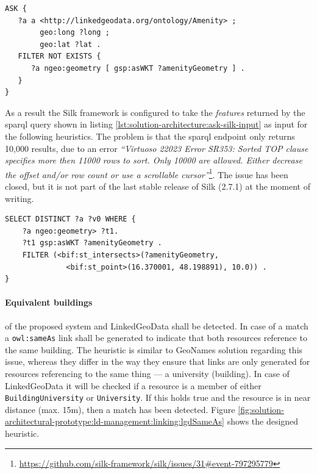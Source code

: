 \documentclass[draft,final]{vutinfth} %
\begin{document}
\begin{lstlisting}[language=sparql, frame=single, basicstyle=\footnotesize, caption=Ask if there is a feature with a location point that has no geometry instance., label={lst:solution-architecture:ask-location-point-geometry}]
ASK {
   ?a a <http://linkedgeodata.org/ontology/Amenity> ;
        geo:long ?long ;
        geo:lat ?lat .
   FILTER NOT EXISTS {
      ?a ngeo:geometry [ gsp:asWKT ?amenityGeometry ] .
   }
}
\end{lstlisting}

As a result the Silk framework is configured to take the \textit{features} returned by the \gls{sparql} query shown in listing \ref{lst:solution-architecture:ask-silk-input} as input for the following heuristics. The problem is that the \gls{sparql} endpoint only returns 10,000 results, due to an error \textit{``Virtuoso 22023 Error SR353: Sorted TOP clause specifies more then 11000 rows to sort. Only 10000 are allowed. Either decrease the offset and/or row count or use a scrollable cursor''}\footnote{\url{https://github.com/silk-framework/silk/issues/31\#event-797295779}}. The issue has been closed, but it is not part of the last stable release of Silk (2.7.1) at the moment of writing.

\begin{lstlisting}[language=sparql, frame=single, basicstyle=\footnotesize, caption=Query for preparing the input for linking., label={lst:solution-architecture:ask-silk-input}]
SELECT DISTINCT ?a ?v0 WHERE {
	?a ngeo:geometry> ?t1. 
	?t1 gsp:asWKT ?amenityGeometry .
	FILTER (<bif:st_intersects>(?amenityGeometry,
			  <bif:st_point>(16.370001, 48.198891), 10.0)) .
}
\end{lstlisting}

\paragraph{Equivalent buildings} of the proposed system and LinkedGeoData shall be detected. In case of a match a \texttt{owl:sameAs} link shall be generated to indicate that both resources reference to the same building. The heuristic is similar to GeoNames solution regarding this issue, whereas they differ in the way they ensure that links are only generated for resources referencing to the same thing --- a university (building). In case of LinkedGeoData it will be checked if a resource is a member of either \texttt{BuildingUniversity} or \texttt{University}. If this holds true and the resource is in near distance (max. 15m), then a match has been detected. Figure \ref{fig:solution-architectural-prototype:ld-management:linking:lgdSameAs} shows the designed heuristic.
\end{document}
